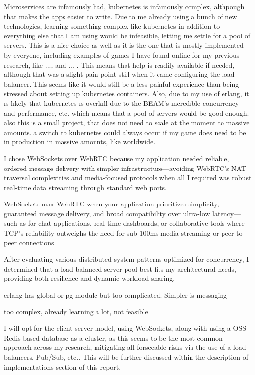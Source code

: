 \documentclass[]{final}
\begin{document}
Microservices are infamously bad, kubernetes is infamously complex, althpough
that makes the apps easier to write. Due to me already using a bunch of new
technologies, learning something complex like kubernetes in addition to
everything else that I am using would be infeasible, letting me settle for
a pool of servers. This is a nice choice as well as it is the one that
is mostly implemented by everyone, including examples of games I have found
online for my previous research, like ..., and ... . This means that help
is readily available if needed, although that was a slight pain point still
when it came configuring the load balancer. This seems like it would still
be a less painful experience than being stressed about setting up kubernetes
containers. Also, due to my use of erlang, it is likely that kubernetes is
overkill due to the BEAM's incredible concurrency and performance, etc. which
means that a pool of servers would be good enough. also this is a small project,
that does not need to scale at the moment to massive amounts.
a switch to kubernetes could always occur if my game does need to be in
production in massive amounts, like worldwide.

I chose WebSockets over WebRTC because my application needed reliable, ordered
message delivery with simpler infrastructure—avoiding WebRTC’s NAT traversal
complexities and media-focused protocols when all I required was robust
real-time data streaming through standard web ports.

WebSockets over WebRTC when your application prioritizes simplicity, guaranteed
message delivery, and broad compatibility over ultra-low latency—such as for
chat applications, real-time dashboards, or collaborative tools where TCP’s
reliability outweighs the need for sub-100ms media streaming or peer-to-peer
connections

After
evaluating various distributed system patterns optimized for concurrency,
I determined that a load-balanced server pool best fits my architectural
needs, providing both resilience and dynamic workload sharing.

erlang has global or pg module but too complicated. Simpler is messaging

too complex, already learning a lot, not feasible


I will opt for the client-server model, using WebSockets, along with using a OSS Redis based database as a cluster,
as this seems to be the most common approach
across my research, mitigating all forseeable risks via the use of a load balancers,
Pub/Sub, etc.. This will be further discussed within the description of implementations section of this report.
\end{document}
